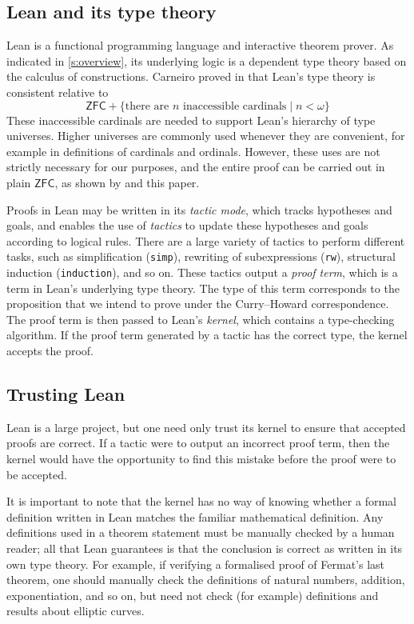 \subsection{Lean and its type theory}

Lean \cite{lean} is a functional programming language and interactive theorem prover.
As indicated in \cref{s:overview}, its underlying logic is a dependent type theory based on the calculus of constructions.
Carneiro proved in \cite{leantt} that Lean's type theory is consistent relative to
\[ \mathsf{ZFC} + \{ \text{there are } n \text{ inaccessible cardinals} \mid n < \omega \} \]
These inaccessible cardinals are needed to support Lean's hierarchy of type universes.
Higher universes are commonly used whenever they are convenient, for example in definitions of cardinals and ordinals.
However, these uses are not strictly necessary for our purposes, and the entire proof can be carried out in plain \( \mathsf{ZFC} \), as shown by \cite{con-nf} and this paper.

Proofs in Lean may be written in its \emph{tactic mode}, which tracks hypotheses and goals, and enables the use of \emph{tactics} to update these hypotheses and goals according to logical rules.
There are a large variety of tactics to perform different tasks, such as simplification (\texttt{simp}), rewriting of subexpressions (\texttt{rw}), structural induction (\texttt{induction}), and so on.
These tactics output a \emph{proof term}, which is a term in Lean's underlying type theory.
The type of this term corresponds to the proposition that we intend to prove under the Curry--Howard correspondence.
The proof term is then passed to Lean's \emph{kernel}, which contains a type-checking algorithm.
If the proof term generated by a tactic has the correct type, the kernel accepts the proof.

\subsection{Trusting Lean}

Lean is a large project, but one need only trust its kernel to ensure that accepted proofs are correct.
If a tactic were to output an incorrect proof term, then the kernel would have the opportunity to find this mistake before the proof were to be accepted.

It is important to note that the kernel has no way of knowing whether a formal definition written in Lean matches the familiar mathematical definition.
Any definitions used in a theorem statement must be manually checked by a human reader; all that Lean guarantees is that the conclusion is correct as written in its own type theory.
For example, if verifying a formalised proof of Fermat's last theorem, one should manually check the definitions of natural numbers, addition, exponentiation, and so on, but need not check (for example) definitions and results about elliptic curves.

